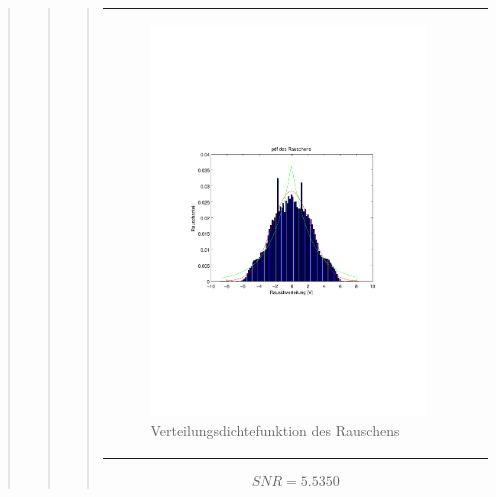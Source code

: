 \begin{quote}
\begin{quote}
\begin{quote}
\begin{center}
\begin{tabular}{ll}
\begin{minipage}{0.6\textwidth}
            \end{minipage}
            
            \begin{minipage}{0.6\textwidth}
                \begin{figure}[H]
                    \includegraphics[scale=0.7, trim = 15mm 80mm 20mm 90mm, clip]{Bilder/hist6}
                    \caption{Verteilungsdichtefunktion des Rauschens}
                    \label{fig:hist6}
                \end{figure}
                
            \end{minipage}
            
        \end{tabular}
        \end{center}
            
            \vspace{2em}
            \begin{equation*}
            \begin{split}
                 SNR = 5.5350
            \end{split}
            \end{equation*}
            

\end{quote}
\end{quote}
\end{quote}
